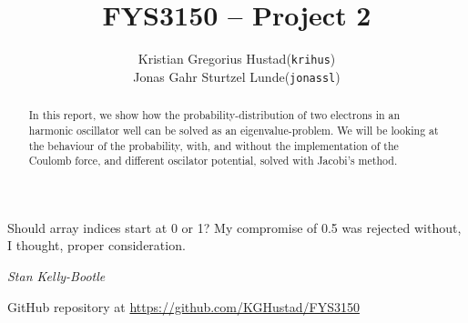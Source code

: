 \documentclass[a4paper]{article}
\begin{document}
\title{FYS3150 -- Project 2}
\author{
    \begin{tabular}{r l}
        Kristian Gregorius Hustad & (\texttt{krihus})\\
        Jonas Gahr Sturtzel Lunde & (\texttt{jonassl})
    \end{tabular}}

\maketitle



\setlength{\epigraphwidth}{0.75\textwidth}
\renewcommand{\epigraphflush}{center}
\renewcommand{\beforeepigraphskip}{50pt}
\renewcommand{\afterepigraphskip}{100pt}
\renewcommand{\epigraphsize}{\normalsize}

\epigraph{Should array indices start at 0 or 1?  My compromise of 0.5 was rejected without, I thought, proper consideration.}
{\textit{Stan Kelly-Bootle}}


\begin{abstract}
\noindent
In this report, we show how the probability-distribution of two electrons in an harmonic oscillator well can be solved as an eigenvalue-problem. We will be looking at the behaviour of the probability, with, and without the implementation of the Coulomb force, and different oscilator potential, solved with Jacobi's method.
\end{abstract}

\vfill


\begin{center}
    GitHub repository at \url{https://github.com/KGHustad/FYS3150}
\end{center}

\newpage

\newcommand{\half}{\frac{1}{2}}
\newcommand{\dx}{{\Delta x}}
\newcommand{\bigO}{{\mathcal{O}}}
\newcommand{\rhomax}{{\rho_{\mathrm{max}}}}
\end{document}
